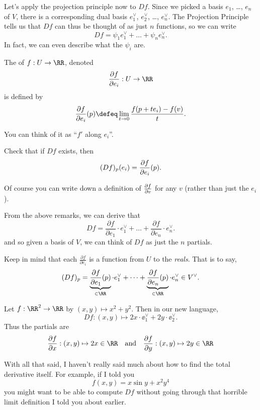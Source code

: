 Let's apply the projection principle now to $Df$.
Since we picked a basis $e_1$, \dots, $e_n$ of $V$,
there is a corresponding dual basis
$e_1^\vee$, $e_2^\vee$, \dots, $e_n^\vee$.
The Projection Principle tells us that $Df$ can thus be thought of as just $n$ functions, so we can write
\[ Df = \psi_1 e_1^\vee + \dots + \psi_n e_n^\vee.  \]
In fact, we can even describe what the $\psi_i$ are.
\begin{definition}
	The  of $f : U \to \RR$, denoted 
	\[ \fpartial{f}{e_i}: U \to \RR \]
	is defined by
	\[
		\fpartial{f}{e_i} (p)
		\defeq \lim_{t \to 0} \frac{f(p + te_i) - f(v)}{t}.
	\]
\end{definition}
You can think of it as ``$f'$ along $e_i$''.
\begin{ques}
	Check that if $Df$ exists, then \[ (Df)_p(e_i) = \frac{\partial f}{\partial e_i}(p). \]
\end{ques}
\begin{remark}
	Of course you can write down a definition of $\frac{\partial f}{\partial v}$
	for any $v$ (rather than just the $e_i$).
\end{remark}

From the above remarks, we can derive that
\[
	\boxed{
	Df =
	\frac{\partial f}{\partial e_1} \cdot e_1^\vee
	+ \dots + 
	\frac{\partial f}{\partial e_n} \cdot e_n^\vee .
	}
\]
and so given a basis of $V$, we can think of $Df$ as just
the $n$ partials.
\begin{remark}
Keep in mind that each $\frac{\partial f}{\partial e_i}$ is a function from $U$ to the \emph{reals}.
That is to say,
\[
	(Df)_p =
	\underbrace{\frac{\partial f}{\partial e_1}(p)}_{\in \RR} \cdot e_1^\vee
	+ \dots + 
	\underbrace{\frac{\partial f}{\partial e_n}(p)}_{\in \RR} \cdot e_n^\vee
	\in V^\vee.
\]
\end{remark}


\begin{example}[Partial Derivatives of $f(x,y) = x^2+y^2$]
	Let $f : \RR^2 \to \RR$ by $(x,y) \mapsto x^2+y^2$.
	Then in our new language, 
	\[ Df : (x,y) \mapsto 2x \cdot \ee_1^\vee + 2y \cdot \ee_2^\vee. \]
	Thus the partials are
	\[
		\frac{\partial f}{\partial x} : (x,y) \mapsto 2x \in \RR
		\quad\text{and}\quad
		\frac{\partial f}{\partial y} : (x,y) \mapsto 2y \in \RR
	\]
\end{example}

With all that said, I haven't really said much about how to
find the total derivative itself.
For example, if I told you
\[ f(x,y) = x \sin y + x^2y^4 \]
you might want to be able to compute $Df$ without going through
that horrible limit definition I told you about earlier.

